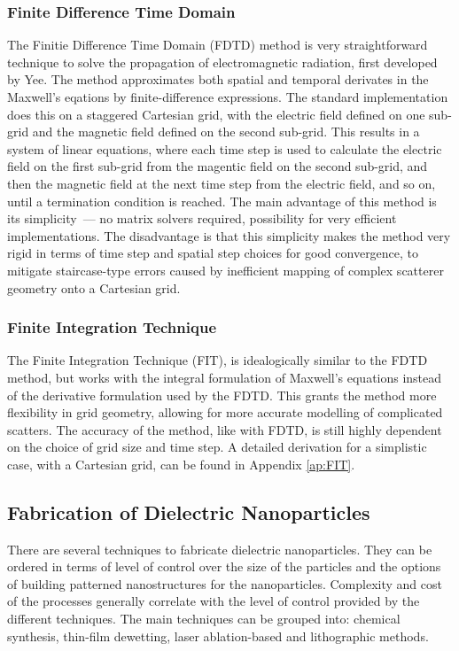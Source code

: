         \subsubsection{Finite Difference Time Domain}
                The Finitie Difference Time Domain (FDTD) method is very straightforward technique to solve the propagation of electromagnetic
            radiation, first developed by Yee\cite{yee1966numerical}. The method approximates both spatial and temporal derivates in the Maxwell's
            eqations by finite-difference expressions. The standard implementation does this on a staggered Cartesian grid, with the electric field
            defined on one sub-grid and the magnetic field defined on the second sub-grid. This results in a system of linear equations, where
            each time step is used to calculate the electric field on the first sub-grid from the magentic field on the second sub-grid, and then
            the magnetic field at the next time step from the electric field, and so on, until a termination condition is reached.
                The main advantage of this method is its simplicity~--- no matrix solvers required, possibility for very efficient implementations.
            The disadvantage is that this simplicity makes the method very rigid in terms of time step and spatial step choices for good convergence,
            to mitigate staircase-type errors caused by inefficient mapping of complex scatterer geometry onto a Cartesian grid.

        \subsubsection{Finite Integration Technique}
                The Finite Integration Technique (FIT)\cite{wieland1977discretization}, is idealogically similar to the FDTD method, but works with the
            integral formulation of Maxwell's equations instead of the derivative formulation used by the FDTD. This grants the method more flexibility
            in grid geometry, allowing for more accurate modelling of complicated scatters. The accuracy of the method, like with FDTD,
            is still highly dependent on the choice of grid size and time step.
                A detailed derivation for a simplistic case, with a Cartesian grid, can be found in Appendix \ref{ap:FIT}.

    \subsection{Fabrication of Dielectric Nanoparticles}
            There are several techniques to fabricate dielectric nanoparticles. They can be ordered in terms of level of control over the size
        of the particles and the options of building patterned nanostructures for the nanoparticles. Complexity and cost of the processes generally
        correlate with the level of control provided by the different techniques.
            The main techniques can be grouped into: chemical synthesis\cite{shi2012new}, thin-film dewetting\cite{abbarchi2014wafer},
        laser ablation-based\cite{zywietz2014laser} and lithographic methods.

